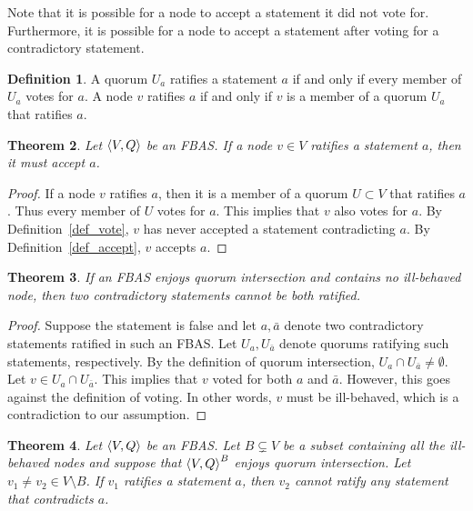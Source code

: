 \documentclass[12pt, psamsfonts]{amsart}
\newtheorem{thm}{Theorem}[section]
\theoremstyle{definition}
\newtheorem{defn}[thm]{Definition}
\theoremstyle{remark}
\numberwithin{equation}{section}
\begin{document}
Note that it is possible for a node to accept a statement it did not vote for.
Furthermore, it is possible for a node to accept a statement after voting for a contradictory statement.

\begin{defn}
    A quorum $U_a$ ratifies a statement $a$ if and only if every member of $U_a$ votes for $a$.
    A node $v$ ratifies $a$ if and only if $v$ is a member of a quorum $U_a$ that ratifies $a$.
\end{defn}

\begin{thm}\label{ratify_implies_accept}
    Let $\ev{V, Q}$ be an FBAS\@.
    If a node $v \in V$ ratifies a statement $a$, then it must accept $a$.
\end{thm}

\begin{proof}
    If a node $v$ ratifies $a$, then it is a member of a quorum $U \subset V$ that ratifies $a$.
    Thus every member of $U$ votes for $a$.
    This implies that $v$ also votes for $a$.
    By Definition~\ref{def_vote}, $v$ has never accepted a statement contradicting $a$.
    By Definition~\ref{def_accept}, $v$ accepts $a$.
\end{proof}

\begin{thm}
    If an FBAS enjoys quorum intersection and contains no ill-behaved node, then two contradictory statements cannot be both ratified.
\end{thm}

\begin{proof}
    Suppose the statement is false and let $a, \bar{a}$ denote two contradictory statements ratified in such an FBAS\@.
    Let $U_a, U_{\bar{a}}$ denote quorums ratifying such statements, respectively.
    By the definition of quorum intersection, $U_a \cap U_{\bar{a}} \ne \emptyset$.
    Let $v \in U_a \cap U_{\bar{a}}$.
    This implies that $v$ voted for both $a$ and $\bar{a}$.
    However, this goes against the definition of voting.
    In other words, $v$ must be ill-behaved, which is a contradiction to our assumption.
\end{proof}

\begin{thm}\label{ill_behaved_ratify}
    Let $\ev{V, Q}$ be an FBAS\@.
    Let $B \subsetneq V$ be a subset containing all the ill-behaved nodes and suppose that $\ev{V, Q}^B$ enjoys quorum intersection.
    Let $v_1 \ne v_2 \in V \setminus B$.
    If $v_1$ ratifies a statement $a$, then $v_2$ cannot ratify any statement that contradicts $a$.
\end{thm}
\end{document}
